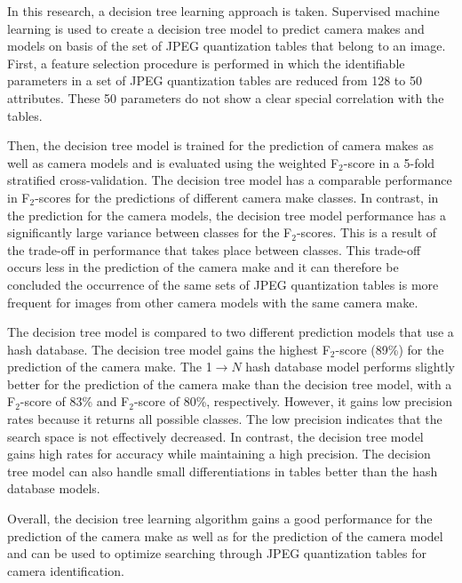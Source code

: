 In this research, a decision tree learning approach is taken. Supervised machine learning is used to create a decision tree model to predict camera makes and models on basis of the set of JPEG quantization tables that belong to an image. First, a feature selection procedure is performed in which the identifiable parameters in a set of JPEG quantization tables are reduced from 128 to 50 attributes. These 50 parameters do not show a clear special correlation with the tables. 

Then, the decision tree model is trained for the prediction of camera makes as well as camera models and is evaluated using the weighted F$_2$-score in a 5-fold stratified cross-validation. The decision tree model has a comparable performance in F$_2$-scores for the predictions of different camera make classes. In contrast, in the prediction for the camera models, the decision tree model performance has a significantly large variance between classes for the F$_2$-scores. This is a result of the trade-off in performance that takes place between classes. This trade-off occurs less in the prediction of the camera make and it can therefore be concluded the occurrence of the same sets of JPEG quantization tables is more frequent for images from other camera models with the same camera make.

The decision tree model is compared to two different prediction models that use a hash database. The decision tree model gains the highest F$_2$-score (89\%) for the prediction of the camera make. The 1$\rightarrow N$ hash database model performs slightly better for the prediction of the camera make than the decision tree model, with a F$_2$-score of 83\% and F$_2$-score of 80\%, respectively. However, it gains low precision rates because it returns all possible classes. The low precision indicates that the search space is not effectively decreased. In contrast, the decision tree model gains high rates for accuracy while maintaining a high precision. The decision tree model can also handle small differentiations in tables better than the hash database models.

Overall, the decision tree learning algorithm gains a good performance for the prediction of the camera make as well as for the prediction of the camera model and can be used to optimize searching through JPEG quantization tables for camera identification.

